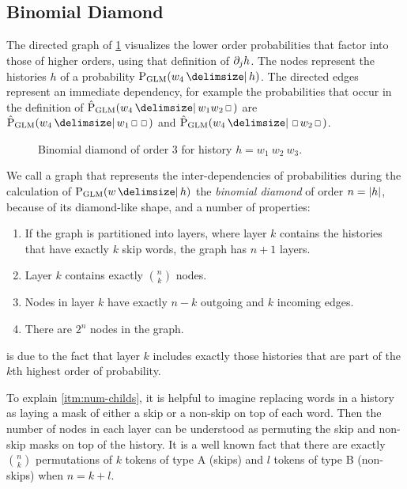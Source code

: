 \subsection{Binomial Diamond}


The directed graph of \cref{fig:history-glm} visualizes the lower order
probabilities that factor into those of higher orders, using that definition of
$\SkpOp[j]{h}$.
The nodes represent the histories $h$ of a probability $\ProbGLM{w_4}{h}$.
The directed edges represent an immediate dependency, for example the
probabilities that occur in the definition of
$\ProbGLM*{w_4}{w_1 w_2 \Skp}$ are $\ProbGLM*{w_4}{w_1 \Skp \Skp}$ and
$\ProbGLM*{w_4}{\Skp w_2 \Skp}$.

\begin{figure}
  \centering
  
  \caption{
    Binomial diamond of order 3 for history $h = w_1 \: w_2 \: w_3$.
  }
  \label{fig:history-glm}
\end{figure}

We call a graph that represents the inter-dependencies of probabilities during
the calculation of $\ProbGLM{w}{h}$ the \emph{binomial diamond} of order
$n = {\left|h\right|}$, because of its diamond-like shape, and a number of
properties:

\begin{enumerate}
  \item \label{itm:num-layers} If the graph is partitioned into layers, where
    layer $k$ contains the histories that have exactly $k$ skip words, the graph
    has $n + 1$ layers.
  \item \label{itm:num-childs} Layer $k$ contains exactly $\binom{n}{k}$ nodes.
  \item \label{itm:num-edges}  Nodes in layer $k$ have exactly $n - k$ outgoing
    and $k$ incoming edges.
  \item \label{itm:num-nodes}  There are $2^n$ nodes in the graph.
\end{enumerate}

 is due to the fact that layer $k$ includes exactly those
histories that are part of the $k$th highest order of probability.

To explain \cref{itm:num-childs}, it is helpful to imagine replacing words in
a history as laying a mask of either a skip or a non-skip on top of each word.
Then the number of nodes in each layer can be understood as permuting the
skip and non-skip masks on top of the history.
It is a well known fact that there are exactly $\binom{n}{k}$ permutations of
$k$ tokens of type A (skips) and $l$ tokens of type B (non-skips) when
$n = k + l$.

